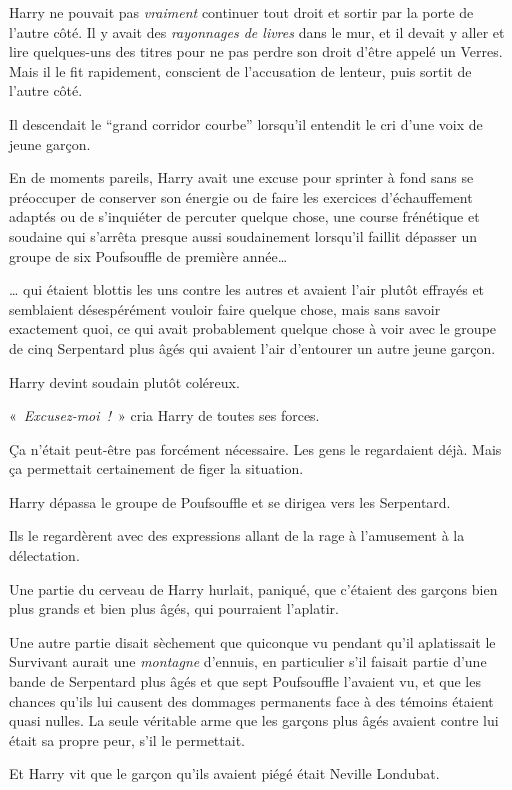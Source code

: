 Harry ne pouvait pas \emph{vraiment} continuer tout droit et sortir par la porte de l'autre côté. Il y avait des \emph{rayonnages de livres} dans le mur, et il devait y aller et lire quelques-uns des titres pour ne pas perdre son droit d'être appelé un Verres. Mais il le fit rapidement, conscient de l'accusation de lenteur, puis sortit de l'autre côté.

Il descendait le “grand corridor courbe” lorsqu'il entendit le cri d'une voix de jeune garçon.

En de moments pareils, Harry avait une excuse pour sprinter à fond sans se préoccuper de conserver son énergie ou de faire les exercices d'échauffement adaptés ou de s'inquiéter de percuter quelque chose, une course frénétique et soudaine qui s'arrêta presque aussi soudainement lorsqu'il faillit dépasser un groupe de six Poufsouffle de première année…

… qui étaient blottis les uns contre les autres et avaient l'air plutôt effrayés et semblaient désespérément vouloir faire quelque chose, mais sans savoir exactement quoi, ce qui avait probablement quelque chose à voir avec le groupe de cinq Serpentard plus âgés qui avaient l'air d'entourer un autre jeune garçon.

Harry devint soudain plutôt coléreux.

«~\emph{Excusez-moi~!}~» cria Harry de toutes ses forces.

Ça n'était peut-être pas forcément nécessaire. Les gens le regardaient déjà. Mais ça permettait certainement de figer la situation.

Harry dépassa le groupe de Poufsouffle et se dirigea vers les Serpentard.

Ils le regardèrent avec des expressions allant de la rage à l'amusement à la délectation.

Une partie du cerveau de Harry hurlait, paniqué, que c'étaient des garçons bien plus grands et bien plus âgés, qui pourraient l'aplatir.

Une autre partie disait sèchement que quiconque vu pendant qu'il aplatissait le Survivant aurait une \emph{montagne} d'ennuis, en particulier s'il faisait partie d'une bande de Serpentard plus âgés et que sept Poufsouffle l'avaient vu, et que les chances qu'ils lui causent des dommages permanents face à des témoins étaient quasi nulles. La seule véritable arme que les garçons plus âgés avaient contre lui était sa propre peur, s'il le permettait.

Et Harry vit que le garçon qu'ils avaient piégé était Neville Londubat.

